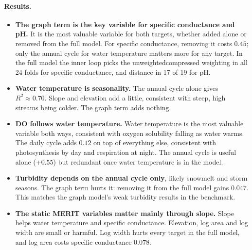 \documentclass[11pt]{article}
\newcommand{\codeus}{\textunderscore\allowbreak}
\newcommand{\code}[1]{{\ttfamily\let\_\codeus #1}}
\begin{document}
\paragraph{Results.}
\begin{itemize}
  \item \textbf{The graph term is the key variable for specific conductance and pH.} It is the most
        valuable variable for both targets, whether added alone or removed from the full model. For
        specific conductance, removing it costs $0.45$; only the annual cycle for water temperature
        matters more for any target. In the full model the inner loop picks the
        \code{unweighted\_compressed} weighting in all 24 folds for specific conductance, and
        distance in 17 of 19 for pH.
  \item \textbf{Water temperature is seasonality.} The annual cycle alone gives $R^2\approx0.70$.
        Slope and elevation add a little, consistent with steep, high streams being colder. The graph
        term adds nothing.
  \item \textbf{DO follows water temperature.} Water temperature is the most valuable variable both
        ways, consistent with oxygen solubility falling as water warms. The daily cycle adds $0.12$
        on top of everything else, consistent with photosynthesis by day and respiration at night.
        The annual cycle is useful alone ($+0.55$) but redundant once water temperature is in the
        model.
  \item \textbf{Turbidity depends on the annual cycle only}, likely snowmelt and storm seasons.
        The graph term hurts it: removing it from the full model gains $0.047$. This matches the
        graph model's weak turbidity results in the benchmark.
  \item \textbf{The static MERIT variables matter mainly through slope.} Slope helps water
        temperature and specific conductance. Elevation, log area and log width are small or harmful.
        Log width hurts every target in the full model, and log area costs specific conductance $0.078$.
\end{itemize}
\end{document}

